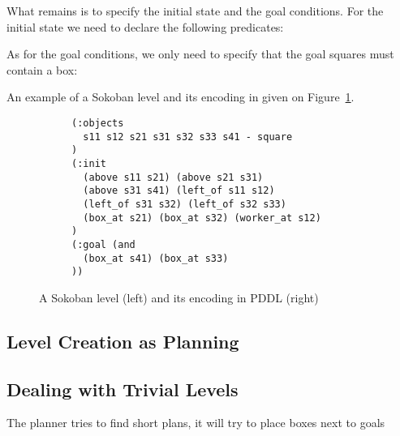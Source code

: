 \documentclass[runningheads]{llncs}
\begin{document}
What remains is to specify the initial state and the goal conditions. For the initial state we need to declare
the following predicates:
As for the goal conditions, we only need to specify that the goal squares must contain a box:
An example of a Sokoban level and its encoding in given on Figure~\ref{fig-solve-example}.

\begin{figure}
\begin{subfigure}[b]{0.35\textwidth}
\centering
\w\w\w\w\e\n
\w\e\p\w\e\n
\w\x\w\w\w\n
\w\e\x\g\w\n
\w\g\w\w\w\n
\w\w\w\e\e\n
\vspace{1em}
\end{subfigure}
\begin{subfigure}[b]{0.65\textwidth}
\begin{verbatim}
(:objects
  s11 s12 s21 s31 s32 s33 s41 - square
)
(:init
  (above s11 s21) (above s21 s31)
  (above s31 s41) (left_of s11 s12)
  (left_of s31 s32) (left_of s32 s33)
  (box_at s21) (box_at s32) (worker_at s12)
)
(:goal (and
  (box_at s41) (box_at s33)
))
\end{verbatim}
\end{subfigure}
\caption{A Sokoban level (left) and its encoding in PDDL (right)}
\label{fig-solve-example}
\end{figure}



\subsection{Level Creation as Planning}


\subsection{Dealing with Trivial Levels}
The planner tries to find short plans, it will try to place boxes next to goals
\end{document}
